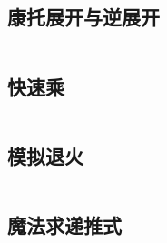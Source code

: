 \documentclass[UTF8]{ctexart}
\begin{document}
\subsection{康托展开与逆展开}
\inputminted{cpp}{others/康托展开与康托逆展开.cpp}

\subsection{快速乘}
\inputminted{cpp}{others/快速乘.cpp}

\subsection{模拟退火}
\inputminted{cpp}{others/模拟退火.cpp}

\subsection{魔法求递推式}
\inputminted{cpp}{others/魔法求递推式.cpp}



\end{document}
